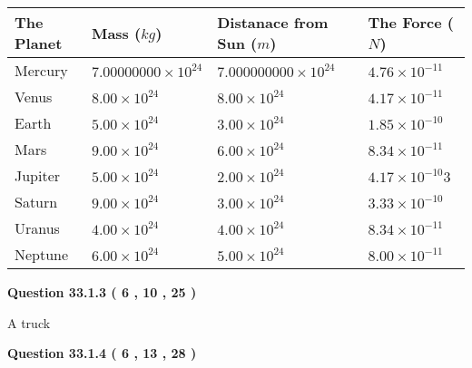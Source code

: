 \documentclass[12pt]{article}
\begin{document}
 
\begin{tabular}{|l|l|l|l|}
\hline
The Planet & Mass ($kg$) & Distanace from Sun ($m$) & The Force ($N$)\\
\hline
Mercury  &
           $ %
7.00000000 \times 10^{24}  $   &
             $ %
7.000000000 \times 10^{24}$    & $ %
4.76 \times 10^{-11} $
\\  \hline
Venus    &
           $  %
8.00 \times 10^{24}  $     &
             $ %
8.00 \times 10^{24} $    & $ %
4.17 \times 10^{-11} $
\\  \hline
Earth    &
           $  %
5.00 \times 10^{24}$     &
             $ %
3.00 \times 10^{24} $    & $ %
1.85 \times 10^{-10} $
\\   \hline
Mars     &
           $  %
9.00 \times 10^{24} $     &
             $ %
6.00 \times 10^{24}$    & $ %
8.34 \times 10^{-11} $
\\   \hline
Jupiter  &
           $  %
5.00 \times 10^{24}  $    &
             $ %
2.00 \times 10^{24} $    & $ %
4.17 \times 10^{-10}3 $
\\  \hline
Saturn   &
           $  %
9.00 \times 10^{24}   $    &
             $ %
3.00 \times 10^{24}  $    & $ %
3.33 \times 10^{-10} $
\\  \hline
Uranus   &
           $  %
4.00 \times 10^{24} $    &
             $ %
4.00 \times 10^{24}$    & $ %
8.34 \times 10^{-11} $
\\  \hline
Neptune  &
           $  %
6.00 \times 10^{24}  $    &
             $ %
5.00 \times 10^{24} $    & $ %
8.00 \times 10^{-11} $
\\  \hline
 
\end{tabular}
 
 
 
 
  
\vspace{0.2in}
  
{\textbf{\Large{Question
33.1.3 
 (           6 ,          10 ,          25 )
}}}
  
  
 
 
\noindent{}
 
 
A truck
 
 
 
 
  
\vspace{0.2in}
  
{\textbf{\Large{Question
33.1.4 
 (           6 ,          13 ,          28 )
}}}
  
\end{document}
